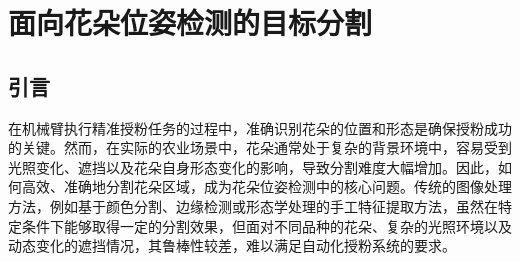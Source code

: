 
\chapter{面向花朵位姿检测的目标分割}\label{ch:3}
\iffalse
\section{引言}
在现代农业中，自动化授粉技术正在成为解决劳动力短缺、提高作物产量和品质的重要手段。其中，机械臂柔顺控制的精准授粉任务对环境感知能力提出了极高的要求。要实现高效、稳定的授粉操作，机械臂需要能够准确感知花朵的空间特征，包括位置、形态、朝向等信息。这些信息的准确性直接决定了授粉的成功率和稳定性，因此，位姿检测是精准授粉技术的关键环节。

为了感知环境信息，机器人通常依赖各种传感器，例如RGB摄像头、深度相机、激光雷达等。其中，RGB-D深度相机由于能够同时提供彩色信息和深度信息，且成本较低，成为农业领域常用的视觉传感器。然而，在复杂的温室或田间环境中，由于光照条件的变化、花朵表面反射特性、叶片遮挡等因素，深度相机采集的数据往往存在噪声、空洞、误差等问题，导致位姿检测精度下降。因此，在使用深度相机数据进行位姿估计前，必须对其进行预处理，包括深度数据修正、去噪、补全等，以确保位姿信息的准确性。

此外，为了便于人机交互和授粉轨迹规划，本章提出了一种基于对称空间的花朵位姿检测方法，能够实时构建虚拟空间并同步更新授粉目标花朵的三维位置和朝向信息。该方法可以计算空间中花朵的位姿，为机械臂的授粉任务提供直观、准确的位姿参考信息，并为后续优化机械臂的运动轨迹提供数据。本章方法的整体技术路线主要包括目标分割、深度校正和位姿估计三个部分：首先，使用基于深度学习的实例分割方法对花朵区域进行精确提取；其次，采用深度校正算法对RGB-D相机采集的数据进行优化，以减少噪声并提高深度信息的可靠性；最后，结合三维重建技术，估计花朵的位姿信息。
\fi
\section{引言}

在机械臂执行精准授粉任务的过程中，准确识别花朵的位置和形态是确保授粉成功的关键。然而，在实际的农业场景中，花朵通常处于复杂的背景环境中，容易受到光照变化、遮挡以及花朵自身形态变化的影响，导致分割难度大幅增加。因此，如何高效、准确地分割花朵区域，成为花朵位姿检测中的核心问题。传统的图像处理方法，例如基于颜色分割、边缘检测或形态学处理的手工特征提取方法，虽然在特定条件下能够取得一定的分割效果，但面对不同品种的花朵、复杂的光照环境以及动态变化的遮挡情况，其鲁棒性较差，难以满足自动化授粉系统的要求。

